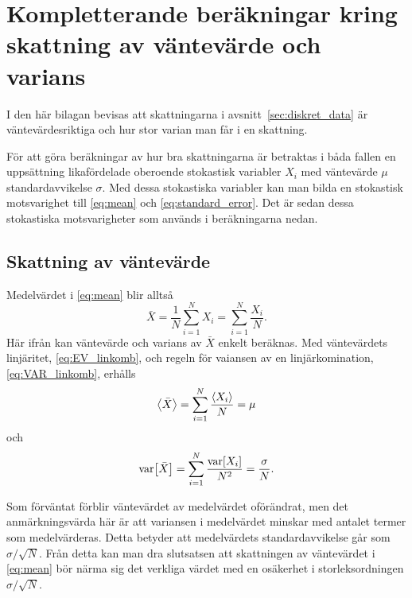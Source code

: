 \chapter{Kompletterande beräkningar kring skattning av väntevärde och varians}
\label{sec:noggrannhet}

I den här bilagan bevisas att skattningarna i avsnitt~\ref{sec:diskret_data} är väntevärdesriktiga och hur stor varian man får i en skattning.

För att göra beräkningar av hur bra skattningarna är betraktas i båda fallen en uppsättning likafördelade oberoende stokastisk variabler $X_i$ med väntevärde $\mu$ standardavvikelse $\sigma$. Med dessa stokastiska variabler kan man bilda en stokastisk motsvarighet\footnotemark{} till \eqref{eq:mean} och \eqref{eq:standard_error}. Det är sedan dessa stokastiska motsvarigheter som används i beräkningarna nedan. 



\section{Skattning av väntevärde}
Medelvärdet i \eqref{eq:mean} blir alltså
\begin{equation}
\bar{X} = \frac{1}{N} \sum_{i=1}^N X_i = \sum_{i=1}^N \frac{X_i}{N}.
\end{equation}
Här ifrån kan väntevärde och varians av $\bar{X}$ enkelt beräknas. Med väntevärdets linjäritet, \eqref{eq:EV_linkomb}, och regeln för vaiansen av en linjärkomination, \eqref{eq:VAR_linkomb}, erhålls
\begin{equation}
\ev{\bar{X}} = \sum_{i=1}^N \frac{\ev{X_i}}{N} = \mu
\end{equation}
och
\begin{equation}
\text{var}\!\left[\bar{X}\right] = \sum_{i=1}^N \frac{\text{var}\!\left[X_i\right]}{N^2} = \frac{\sigma}{N}.
\end{equation}

Som förväntat förblir väntevärdet av medelvärdet oförändrat, men det anmärkningsvärda här är att variansen i medelvärdet minskar med antalet termer som medelvärderas. Detta betyder att medelvärdets standardavvikelse går som $\sigma/\sqrt{N}$.
Från detta kan man dra slutsatsen att skattningen av väntevärdet i \eqref{eq:mean} bör närma sig det verkliga värdet med en osäkerhet i storleksordningen $\sigma/\sqrt{N}$. 

